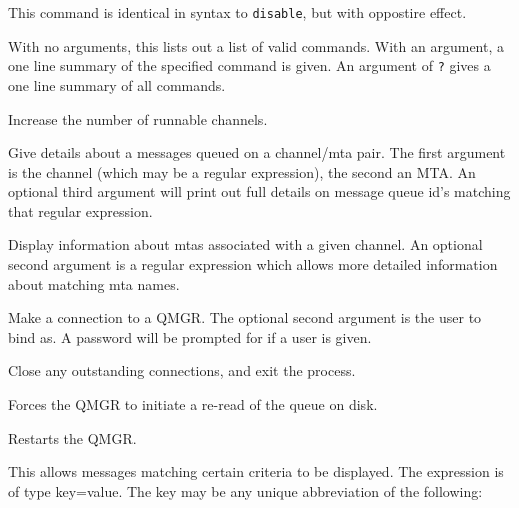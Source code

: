 \begin{describe}
\item[\verb|enable|:] This command is identical in syntax to
\verb|disable|, but with oppostire effect.

\item[\verb|help|:] With no arguments, this lists out a list of valid
commands. With an argument, a one line summary of the specified
command is given. An argument of \verb|?| gives a one line summary of
all commands.

\item[\verb|increase|:] Increase the number of runnable channels.

\item[\verb|msg|:] Give details about a messages queued on a
channel/mta pair. The first argument is the channel (which may be a
regular expression), the second an MTA. An optional third argument
will print out full details on message queue id's matching that regular
expression.

\item[\verb|mta|:] Display information about mtas associated with a
given channel. An optional second argument is a regular expression
which allows more detailed information about matching mta names.

\item[\verb|open|:] Make a connection to a QMGR. The optional second
argument is the user to bind as. A password will be prompted for if a
user is given.

\item[\verb|quit|:] Close any outstanding connections, and exit the
process.

\item[\verb|rereadqueue|:] Forces the QMGR to initiate a re-read of
the queue on disk. 

\item[\verb|restart|:] Restarts the QMGR.

\item[\verb|show|:] This allows messages matching certain criteria to
be displayed. The expression is of type key=value. The key may be any
unique abbreviation of the following:


\end{describe}
